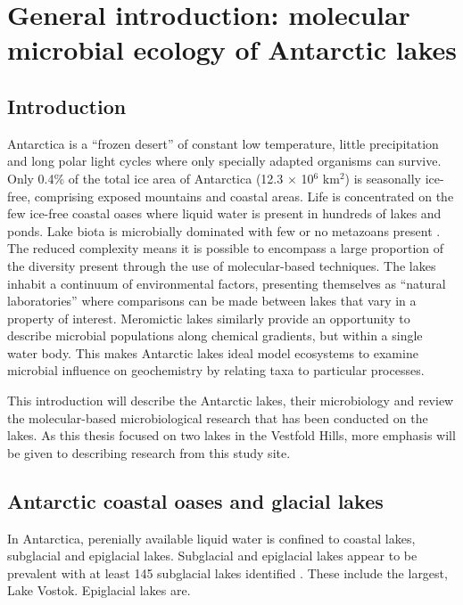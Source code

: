 \chapter[General Introduction]{General introduction: molecular microbial ecology of Antarctic lakes}
\label{ch:intro}

\section{Introduction}
Antarctica is a ``frozen desert'' of constant low temperature, little precipitation and long polar light cycles where only specially adapted organisms can survive.
Only 0.4\% of the total ice area of Antarctica (12.3 $\times$ 10$^6$ km$^2$) is seasonally ice-free, comprising exposed mountains and coastal areas. %
Life is concentrated on the few ice-free coastal oases where liquid water is present in hundreds of lakes and ponds.
Lake biota is microbially dominated with few or no metazoans present \cite{Laybourne-Parry1997}.
The reduced complexity means it is possible to encompass a large proportion of the diversity present through the use of molecular-based techniques.
The lakes inhabit a continuum of environmental factors, presenting themselves as ``natural laboratories'' where comparisons can be made between lakes that vary in a property of interest. 
Meromictic lakes similarly provide an opportunity to describe microbial populations along chemical gradients, but within a single water body. 
This makes Antarctic lakes ideal model ecosystems to examine microbial influence on geochemistry by relating taxa to particular processes\cite{Laybourne-Parry2007}.

This introduction will describe the Antarctic lakes, their microbiology and review the molecular-based microbiological research that has been conducted on the lakes.
As this thesis focused on two lakes in the Vestfold Hills, more emphasis will be given to describing research from this study site.

\section[Antarctic coastal oases]{Antarctic coastal oases and glacial lakes}
In Antarctica, perenially available liquid water is confined to coastal lakes, subglacial and epiglacial lakes.
Subglacial and epiglacial lakes appear to be prevalent with at least 145 subglacial lakes identified \cite{Siegert2005}.%
These include the largest, Lake Vostok. %
Epiglacial lakes are. %

